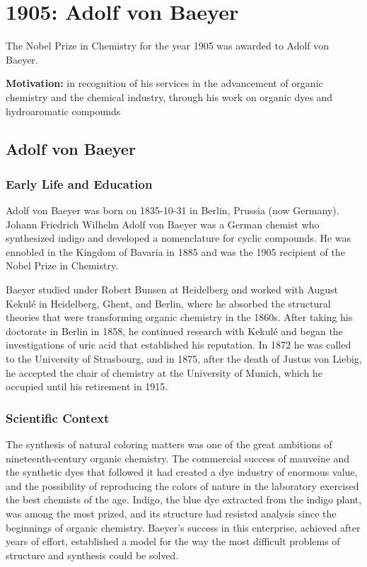 \chapter{1905: Adolf von Baeyer}
\label{chap:chemistry1905}

The Nobel Prize in Chemistry for the year 1905 was awarded to Adolf von Baeyer.

\textbf{Motivation:}
in recognition of his services in the advancement of organic chemistry and the chemical industry, through his work on organic dyes and hydroaromatic compounds

\section{Adolf von Baeyer}

\subsection*{Early Life and Education}

Adolf von Baeyer was born on 1835-10-31 in Berlin, Prussia (now Germany).
Johann Friedrich Wilhelm Adolf von Baeyer was a German chemist who synthesized indigo and developed a nomenclature for cyclic compounds. He was ennobled in the Kingdom of Bavaria in 1885 and was the 1905 recipient of the Nobel Prize in Chemistry.

Baeyer studied under Robert Bunsen at Heidelberg and worked with August Kekulé in Heidelberg, Ghent, and Berlin, where he absorbed the structural theories that were transforming organic chemistry in the 1860s. After taking his doctorate in Berlin in 1858, he continued research with Kekulé and began the investigations of uric acid that established his reputation. In 1872 he was called to the University of Strasbourg, and in 1875, after the death of Justus von Liebig, he accepted the chair of chemistry at the University of Munich, which he occupied until his retirement in 1915.

\subsection*{Scientific Context}

The synthesis of natural coloring matters was one of the great ambitions of nineteenth-century organic chemistry. The commercial success of mauveine and the synthetic dyes that followed it had created a dye industry of enormous value, and the possibility of reproducing the colors of nature in the laboratory exercised the best chemists of the age. Indigo, the blue dye extracted from the indigo plant, was among the most prized, and its structure had resisted analysis since the beginnings of organic chemistry. Baeyer's success in this enterprise, achieved after years of effort, established a model for the way the most difficult problems of structure and synthesis could be solved.

